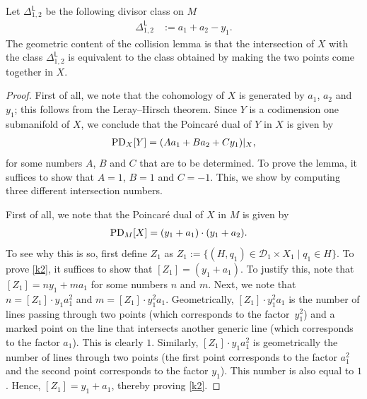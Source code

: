 \documentclass[pdftex]{sigma}
\numberwithin{equation}{section}
\begin{document}
\begin{rem}
 Let $\Delta_{1, 2}^{\mathsf{L}}$
be the following divisor class on $M$
\begin{align}
\Delta_{1, 2}^{\mathsf{L}}& := a_1 + a_2-y_1. \label{Line_Diag_Defn}
\end{align}
The geometric content of the collision lemma
is that the intersection of $X$ with the class $\Delta_{1, 2}^{\mathsf{L}}$ is equivalent to the class
obtained by making the two points come together in $X$. \end{rem}

\begin{proof} First of all, we note that the cohomology of $X$
is generated by $a_1$, $a_2$ and $y_1$; this follows from the Leray--Hirsch theorem.
Since $Y$ is a codimension one submanifold of $X$, we conclude that the
Poincar\'{e} dual of $Y$ in $X$ is given by
\begin{align}
\textnormal{PD}_{X}[Y] = (A a_1 + B a_2 + C y_1)|_{X}, \label{k1}
\end{align}
for some numbers $A$, $B$ and $C$ that are to be determined.
To prove the lemma, it suffices to show that $A = 1$, $ B = 1$ and $C = -1$.
This, we show by computing three different intersection numbers.

First of all, we note that the Poincar\'{e} dual of $X$ in $M$ is given by
\begin{align}
\textnormal{PD}_{M}[X]& = (y_1+a_1)\cdot(y_1+a_2). \label{k2}
\end{align}
To see why this is so, first define $Z_1$ as
$
Z_1 := \{ (H, q_1) \in \mathcal{D}_1 \times X_1  \mid  q_1 \in H\}$.
To prove \eqref{k2}, it suffices to show that $[Z_1] = (y_1 + a_1)$.
To justify this, note that
$[Z_1] = n y_1 + m a_1$ for some numbers $n$ and $m$. Next, we note that
$n = [Z_1]\cdot y_1 a_1^2$ and $m = [Z_1]\cdot y_1^2 a_1$.
Geometrically, $[Z_1]\cdot y_1^2 a_1$ is the number of lines passing through
two points \big(which corresponds to the factor~$y_1^2$\big) and a marked point on the line
that intersects another generic line (which corresponds to the factor $a_1$). This is
clearly $1$. Similarly, $[Z_1]\cdot y_1 a_1^2$ is geometrically the number of lines
through two points (the first point corresponds to the factor $a_1^2$ and the second point
corresponds to the factor $y_1$). This number is also equal to $1$. Hence,
$[Z_1]= y_1 + a_1$, thereby proving \eqref{k2}.


\end{proof}
\end{document}
